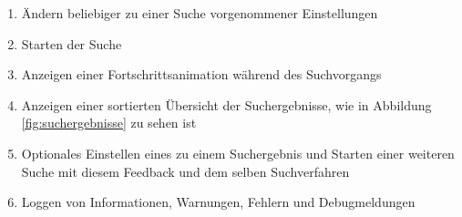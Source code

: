 \begin{enumerate} [label=\bfseries /F \arabic*0/, leftmargin=*]
	\item Ändern beliebiger zu einer Suche vorgenommener Einstellungen \label{f:einstellungen_nach_ueberpruefung_aendern}
	\newline
	\item Starten der Suche \label{f:suche_starten}
	\item Anzeigen einer Fortschrittsanimation während des Suchvorgangs \label{f:fortschrittsanimation}
	\newline
	\item Anzeigen einer sortierten \"Ubersicht der Suchergebnisse, wie in Abbildung \ref{fig:suchergebnisse} zu sehen ist \label{f:suchergebnisse_anzeigen}
	\item Optionales Einstellen eines  zu einem Suchergebnis und Starten einer weiteren Suche mit diesem \gls{Feedback} und dem selben \gls{Suchverfahren} \label{f:feedback}
	
	\item Loggen von Informationen, Warnungen, Fehlern und Debugmeldungen \label{f:loggen}
	 
\end{enumerate}

